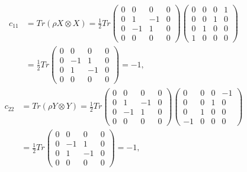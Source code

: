\documentclass[10pt]{article}
\begin{document}
\begin{align*}
c_{11} &= Tr (\rho X \otimes X) = \frac{1}{2} Tr 
\begin{pmatrix}
        0 & 0   & 0   & 0 \\
        0 & 1   & -1 & 0 \\
        0 & -1 & 1   & 0 \\
        0 & 0   & 0   & 0 
\end{pmatrix}
\begin{pmatrix}
0 & 0 & 0 & 1 \\
0 & 0 & 1 & 0 \\
0 & 1 & 0 & 0 \\
1 & 0 & 0 & 0 
\end{pmatrix} \\
&= \frac{1}{2} Tr 
\begin{pmatrix}
0 & 0 & 0 & 0 \\
0 & -1 & 1 & 0 \\
0 & 1 & -1 & 0 \\
0 & 0 & 0 & 0 
\end{pmatrix} = -1,
\end{align*}
\begin{align*}
c_{22} &= Tr (\rho Y \otimes Y) = \frac{1}{2} Tr 
\begin{pmatrix}
        0 & 0   & 0   & 0 \\
        0 & 1   & -1 & 0 \\
        0 & -1 & 1   & 0 \\
        0 & 0   & 0   & 0 
\end{pmatrix}
\begin{pmatrix}
0 & 0 & 0 & -1 \\
0 & 0 & 1 & 0 \\
0 & 1 & 0 & 0 \\
-1 & 0 & 0 & 0 
\end{pmatrix} \\
&= \frac{1}{2} Tr 
\begin{pmatrix}
0 & 0 & 0 & 0 \\
0 & -1 & 1 & 0 \\
0 & 1 & -1 & 0 \\
0 & 0 & 0 & 0 
\end{pmatrix} = -1,
\end{align*}
\end{document}
